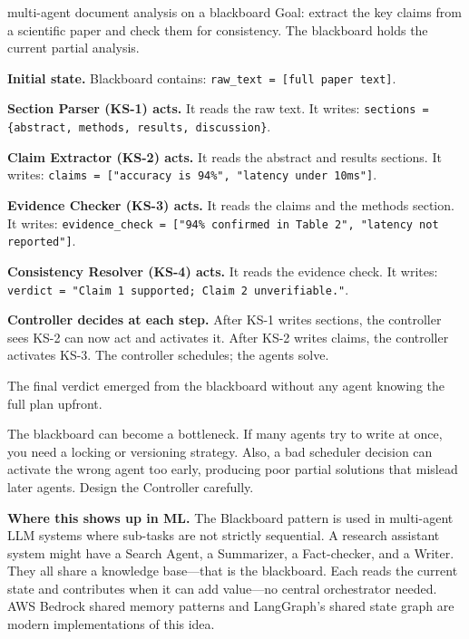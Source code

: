 \documentclass[a4paper,11pt]{article}
\begin{document}
\begin{worked}{multi-agent document analysis on a blackboard}
Goal: extract the key claims from a scientific paper and check them for consistency.
The blackboard holds the current partial analysis.

\begin{steps}
  \item \textbf{Initial state.}
        Blackboard contains: \texttt{raw\_text = [full paper text]}.
  \item \textbf{Section Parser (KS-1) acts.}
        It reads the raw text.
        It writes: \texttt{sections = \{abstract, methods, results, discussion\}}.
  \item \textbf{Claim Extractor (KS-2) acts.}
        It reads the abstract and results sections.
        It writes: \texttt{claims = ["accuracy is 94\%", "latency under 10ms"]}.
  \item \textbf{Evidence Checker (KS-3) acts.}
        It reads the claims and the methods section.
        It writes: \texttt{evidence\_check = ["94\% confirmed in Table 2", "latency not reported"]}.
  \item \textbf{Consistency Resolver (KS-4) acts.}
        It reads the evidence check.
        It writes: \texttt{verdict = "Claim 1 supported; Claim 2 unverifiable."}.
  \item \textbf{Controller decides at each step.}
        After KS-1 writes sections, the controller sees KS-2 can now act and activates it.
        After KS-2 writes claims, the controller activates KS-3.
        The controller schedules; the agents solve.
\end{steps}
The final verdict emerged from the blackboard without any agent knowing the full plan upfront.
\end{worked}

\begin{watchout}
The blackboard can become a bottleneck.
If many agents try to write at once, you need a locking or versioning strategy.
Also, a bad scheduler decision can activate the wrong agent too early, producing poor partial solutions that mislead later agents.
Design the Controller carefully.
\end{watchout}

\textbf{Where this shows up in ML.}
The Blackboard pattern is used in multi-agent LLM systems where sub-tasks are not strictly sequential.
A research assistant system might have a Search Agent, a Summarizer, a Fact-checker, and a Writer.
They all share a knowledge base---that is the blackboard.
Each reads the current state and contributes when it can add value---no central orchestrator needed.
AWS Bedrock shared memory patterns and LangGraph's shared state graph are modern implementations of this idea.
\end{document}
